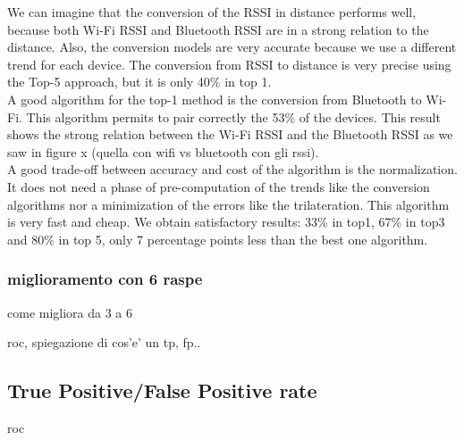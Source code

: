 We can imagine that the conversion of the RSSI in distance performs well, because both Wi-Fi RSSI and Bluetooth RSSI are in a strong relation to the distance. Also, the conversion models are very accurate because we use a different trend for each device.
\linebreak
The conversion from RSSI to distance is very precise using the Top-5 approach, but it is only 40\% in top 1.\\
A good algorithm for the top-1 method is the conversion from Bluetooth to Wi-Fi. This algorithm permits to pair correctly the 53\% of the devices. This result shows the strong relation between the Wi-Fi RSSI and the Bluetooth RSSI as we saw in figure x (quella con wifi vs bluetooth con gli rssi).\\
\linebreak
A good trade-off between accuracy and cost of the algorithm is the normalization. It does not need a phase of pre-computation of the trends like the conversion algorithms nor a minimization of the errors like the trilateration. This algorithm is very fast and cheap. We obtain satisfactory results: 33\% in top1, 67\% in top3 and 80\% in top 5, only 7 percentage points less than the best one algorithm.

\subsubsection{miglioramento con 6 raspe}
come migliora da 3 a 6 


roc, spiegazione di cos'e' un tp, fp..






\subsection{True Positive/False Positive rate}
roc

